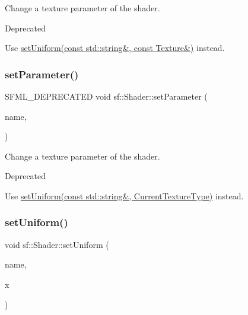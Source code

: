 Change a texture parameter of the shader. 

\begin{DoxyRefDesc}{Deprecated}
\item[\hyperlink{deprecated__deprecated000015}{Deprecated}]Use \hyperlink{classsf_1_1_shader_a7806a29ffbd0ee9251256a9e7265d479}{set\+Uniform(const std\+::string\&, const Texture\&)} instead.\end{DoxyRefDesc}
\mbox{\label{classsf_1_1_shader_a0fa7ecad14206e4d5edae1d6aa87f553}} 
\subsubsection{\texorpdfstring{set\+Parameter()}{setParameter()}\hspace{0.1cm}{\footnotesize\ttfamily [10/10]}}
{\footnotesize\ttfamily S\+F\+M\+L\+\_\+\+D\+E\+P\+R\+E\+C\+A\+T\+ED void sf\+::\+Shader\+::set\+Parameter (\begin{DoxyParamCaption}\item[{const std\+::string \&}]{name,  }\item[{\hyperlink{structsf_1_1_shader_1_1_current_texture_type}{Current\+Texture\+Type}}]{ }\end{DoxyParamCaption})}



Change a texture parameter of the shader. 

\begin{DoxyRefDesc}{Deprecated}
\item[\hyperlink{deprecated__deprecated000016}{Deprecated}]Use \hyperlink{classsf_1_1_shader_ab18f531e1f726b88fec1cf5a1e6af26d}{set\+Uniform(const std\+::string\&, Current\+Texture\+Type)} instead.\end{DoxyRefDesc}
\mbox{\label{classsf_1_1_shader_abf78e3bea1e9b0bab850b6b0a0de29c7}} 
\subsubsection{\texorpdfstring{set\+Uniform()}{setUniform()}\hspace{0.1cm}{\footnotesize\ttfamily [1/16]}}
{\footnotesize\ttfamily void sf\+::\+Shader\+::set\+Uniform (\begin{DoxyParamCaption}\item[{const std\+::string \&}]{name,  }\item[{float}]{x }\end{DoxyParamCaption})}



